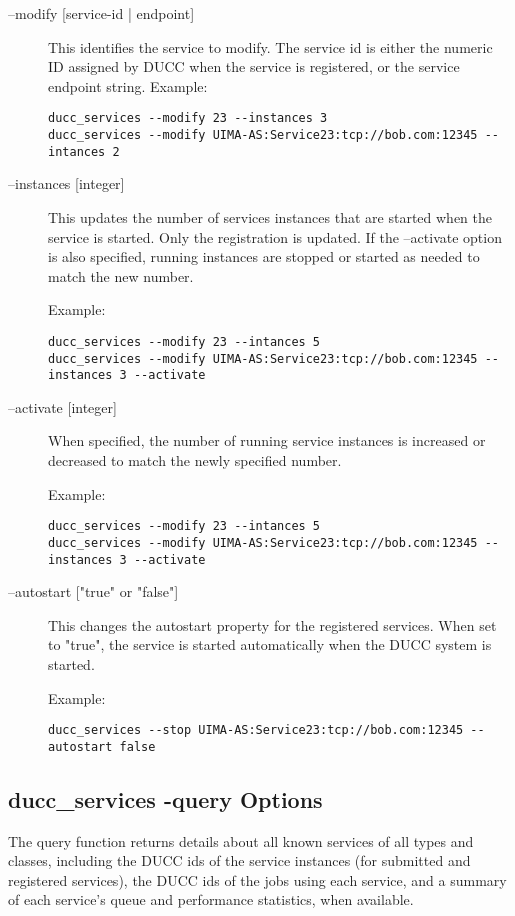     \begin{description}
        \item[--modify {[service-id | endpoint]}]  This identifies the service to modify. The service id is either
          the numeric ID assigned by DUCC when the service is registered, or the service endpoint
          string.  Example:
\begin{verbatim}
ducc_services --modify 23 --instances 3 
ducc_services --modify UIMA-AS:Service23:tcp://bob.com:12345 --intances 2 
\end{verbatim}

        \item[ --instances {[integer]}] This updates the number of services instances that are
          started when the service is started.  Only the registration is updated. If the --activate
          option is also specified, running instances are stopped or started as needed to match the
          new number.

          Example: 
\begin{verbatim}
ducc_services --modify 23 --intances 5 
ducc_services --modify UIMA-AS:Service23:tcp://bob.com:12345 --instances 3 --activate 
\end{verbatim}

        \item[ --activate {[integer]}] When specified, the number of running service instances is
          increased or decreased to match the newly specified number.

          Example: 
\begin{verbatim}
ducc_services --modify 23 --intances 5 
ducc_services --modify UIMA-AS:Service23:tcp://bob.com:12345 --instances 3 --activate 
\end{verbatim}

        \item[ --autostart {["true" or "false"]}] This changes the autostart property for the
          registered services. When set to "true", the service is started automatically when the
          DUCC system is started.

          Example: 
\begin{verbatim}
ducc_services --stop UIMA-AS:Service23:tcp://bob.com:12345 --autostart false 
\end{verbatim}
        \end{description}

    \subsection{ducc\_services -query Options}
    The query function returns details about all known services of all types and classes, including 
    the DUCC ids of the service instances (for submitted and registered services), the DUCC ids of 
    the jobs using each service, and a summary of each service's queue and performance statistics, 
    when available. 
    


